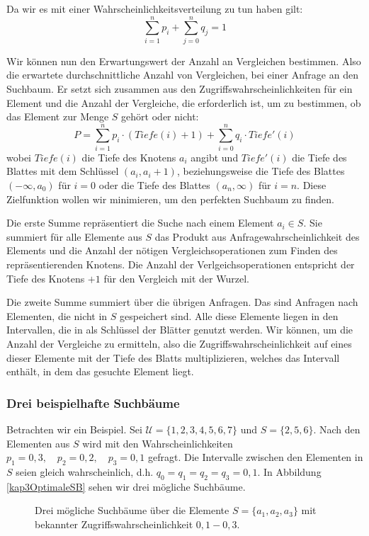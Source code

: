 Da wir es mit einer Wahrscheinlichkeitsverteilung zu tun haben gilt:
\[ \sum_{i=1}^n p_i + \sum_{j=0}^n q_j = 1\]

Wir können nun den Erwartungswert der Anzahl an Vergleichen bestimmen. Also die erwartete durchschnittliche Anzahl von Vergleichen, bei einer Anfrage an den Suchbaum. Er setzt sich zusammen aus den Zugriffswahrscheinlichkeiten für ein Element und die Anzahl der Vergleiche, die erforderlich ist, um zu bestimmen, ob das Element zur Menge $S$ gehört oder nicht:
\[ P = \sum_{i=1}^n p_i \cdot (Tiefe(i) + 1) + \sum_{i=0}^n q_i \cdot Tiefe'(i) \]
wobei $Tiefe(i)$ die Tiefe des Knotens $a_i$ angibt und $Tiefe'(i)$ die Tiefe des Blattes mit dem Schlüssel $(a_i, a_i+1)$, beziehungsweise die Tiefe des Blattes $(-\infty, a_0)$ für $i=0$ oder die Tiefe des Blattes $(a_n, \infty)$ für $i=n$. Diese Zielfunktion wollen wir minimieren, um den perfekten Suchbaum zu finden.

Die erste Summe repräsentiert die Suche nach einem Element $a_i \in S$. Sie summiert für alle Elemente aus $S$ das Produkt aus Anfragewahrscheinlichkeit des Elements und die Anzahl der nötigen Vergleichsoperationen zum Finden des repräsentierenden Knotens. Die Anzahl der Verlgeichsoperationen entspricht der Tiefe des Knotens $+1$ für den Vergleich mit der Wurzel.

Die zweite Summe summiert über die übrigen Anfragen. Das sind Anfragen nach Elementen, die nicht in $S$ gespeichert sind. Alle diese Elemente liegen in den Intervallen, die in als Schlüssel der Blätter genutzt werden. Wir können, um die Anzahl der Vergleiche zu ermitteln, also die Zugriffswahrscheinlichkeit auf eines dieser Elemente mit der Tiefe des Blatts multiplizieren, welches das Intervall enthält, in dem das gesuchte Element liegt.

\subsubsection{Drei beispielhafte Suchbäume}


Betrachten wir ein Beispiel. Sei $\mathcal{U} = \{1, 2, 3, 4, 5, 6, 7\}$ und $S = \{2, 5, 6\}$. Nach den Elementen aus $S$ wird mit den Wahrscheinlichkeiten $p_1 = 0{,}3,\quad p_2 = 0{,}2,\quad p_3 = 0{,}1$ gefragt. Die Intervalle zwischen den Elementen in $S$ seien gleich wahrscheinlich, d.h. $q_0 = q_1 = q_2 = q_3 = 0{,}1$. In Abbildung \vref{kap3OptimaleSB} sehen wir drei mögliche Suchbäume.

\begin{figure}[htb]
  \centering
  
  \hspace{.05\textwidth}

  \caption{Drei mögliche Suchbäume über die Elemente $S=\{a_1, a_2, a_3\}$ mit bekannter Zugriffswahrscheinlichkeit $0{,}1 - 0{,}3$.}
  \label{kap3OptimaleSB}
\end{figure}

